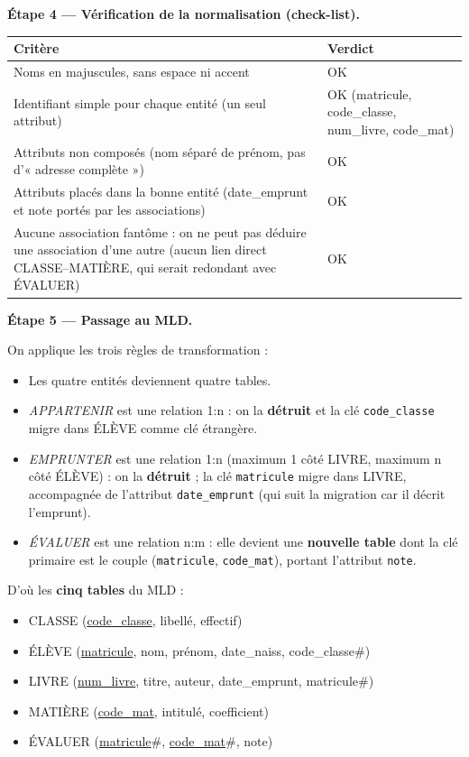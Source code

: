 \documentclass[11pt]{article}
\begin{document}
\begin{exoresolu}
\textbf{Étape 4 — Vérification de la normalisation (check-list).}

\begin{center}
\begin{tabularx}{\linewidth}{|X|l|}
\hline
\rowcolor{popblueL} \textbf{Critère} & \textbf{Verdict} \\
\hline
Noms en majuscules, sans espace ni accent & OK \\
\hline
Identifiant simple pour chaque entité (un seul attribut) & OK (matricule, code\_classe, num\_livre, code\_mat) \\
\hline
Attributs non composés (nom séparé de prénom, pas d'« adresse complète ») & OK \\
\hline
Attributs placés dans la bonne entité (date\_emprunt et note portés par les associations) & OK \\
\hline
Aucune association fantôme : on ne peut pas déduire une association d'une autre (aucun lien direct CLASSE--MATIÈRE, qui serait redondant avec ÉVALUER) & OK \\
\hline
\end{tabularx}
\end{center}

\textbf{Étape 5 — Passage au MLD.}

On applique les trois règles de transformation :

\begin{itemize}
\item Les quatre entités deviennent quatre tables.
\item \emph{APPARTENIR} est une relation 1:n : on la \textbf{détruit} et la clé \texttt{code\_classe} migre dans ÉLÈVE comme clé étrangère.
\item \emph{EMPRUNTER} est une relation 1:n (maximum 1 côté LIVRE, maximum n côté ÉLÈVE) : on la \textbf{détruit} ; la clé \texttt{matricule} migre dans LIVRE, accompagnée de l'attribut \texttt{date\_emprunt} (qui suit la migration car il décrit l'emprunt).
\item \emph{ÉVALUER} est une relation n:m : elle devient une \textbf{nouvelle table} dont la clé primaire est le couple (\texttt{matricule}, \texttt{code\_mat}), portant l'attribut \texttt{note}.
\end{itemize}

D'où les \textbf{cinq tables} du MLD :

\begin{itemize}
\item CLASSE (\underline{code\_classe}, libellé, effectif)
\item ÉLÈVE (\underline{matricule}, nom, prénom, date\_naiss, code\_classe\#)
\item LIVRE (\underline{num\_livre}, titre, auteur, date\_emprunt, matricule\#)
\item MATIÈRE (\underline{code\_mat}, intitulé, coefficient)
\item ÉVALUER (\underline{matricule}\#, \underline{code\_mat}\#, note)
\end{itemize}


\end{exoresolu}
\end{document}

